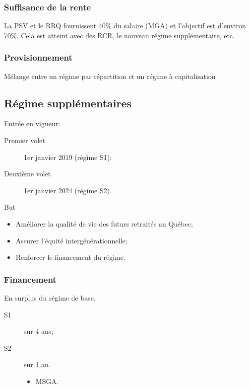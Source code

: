 \documentclass[10pt, french]{article}
\begin{document}
\begin{multicols*}{3}
\subsubsection*{Suffisance de la rente}
La PSV et le RRQ fournissent 40\% du salaire (MGA) et l'objectif est d'environ 70\%. Cela est atteint avec des RCR, le nouveau régime supplémentaire, etc.

\subsubsection*{Provisionnement}
Mélange entre un régime par répartition et un régime à capitalisation


\subsection*{Régime supplémentaires}
\begin{rappel_enhanced}[Historique]
Entrée en vigueur:
\begin{description}
	\item[Premier volet]	1er janvier 2019 (régime S1);
	\item[Deuxième volet]	1er janvier 2024	(régime S2).
\end{description}
\end{rappel_enhanced}

\begin{conceptgen}{But}
\begin{itemize}[leftmargin = *]
	\item	Améliorer la qualité de vie des futurs retraités au Québec;
	\item	Assurer l'équité intergénérationnelle;
	\item	Renforcer le financement du régime.
\end{itemize}
\end{conceptgen}

\subsubsection*{Financement}
En surplus du régime de base.
\begin{description}
	\item[S1]	sur 4 ans;
	\item[S2]	sur 1 an.
		\begin{itemize}[leftmargin = *]
		\item	MSGA.
		\end{itemize}
\end{description}


\end{multicols*}
\end{document}
